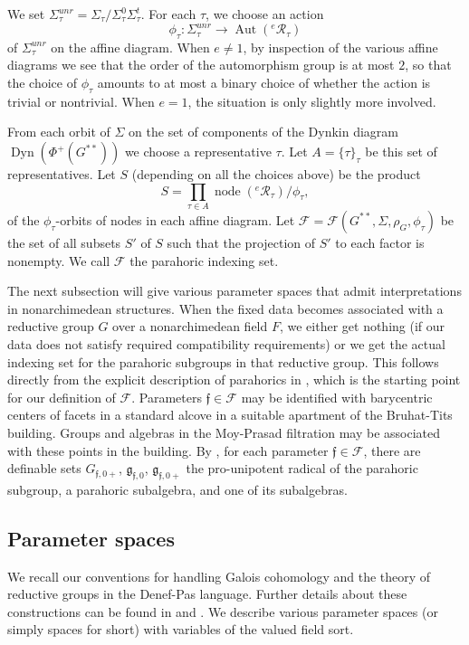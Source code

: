 \documentclass[12pt]{amsart}
\newcommand{\op}[1]{\operatorname{#1}}
\newcommand{\cal}[1]{\mathcal{#1}}
\def\R{\cal{R}}
\def\s{{\mathfrak{f}}}
\newcommand{\cF}{\mathcal{F}}
\newcommand{\fg}{\mathfrak{g}}
\theoremstyle{plain}
\theoremstyle{definition}
\begin{document}
We set $\Sigma^{unr}_\tau = \Sigma_\tau/\Sigma_\tau^0\Sigma^t_\tau$.
For each $\tau$, we choose an action
\[
\phi_\tau:\Sigma^{unr}_\tau\to \op{Aut}({}^e\R_\tau)
\]
of $\Sigma^{unr}_\tau$ on the affine diagram.  When $e\ne 1$, by
inspection of the various affine diagrams we see that the order of the
automorphism group is at most $2$, so that the choice of $\phi_\tau$
amounts to at most a binary choice of whether the action is trivial or
nontrivial.  When $e=1$, the situation is only slightly more
involved.

From each orbit of $\Sigma$ on the set of components of the Dynkin
diagram $\op{Dyn}(\Phi^+(G^{**}))$ we choose a representative
$\tau$.  Let $A = \{\tau\}_\tau$ be this set of representatives.  Let
$S$ (depending on all the choices above) be the product
\[
S = \prod_{\tau\in A} \op{node}({}^e\R_\tau)/\phi_\tau,
\]
of the $\phi_\tau$-orbits of nodes in each affine diagram.  Let $\cF
= \cF(G^{**},\Sigma,\rho_G,\phi_\tau)$ be the set of all
subsets $S'$ of $S$ such that the projection of $S'$ to each factor is
nonempty.  We call $\cF$ the parahoric indexing set.

The next subsection will give various parameter spaces that admit
interpretations in nonarchimedean structures.  When the fixed data
becomes associated with a reductive group $G$ over a nonarchimedean
field $F$, we either get nothing (if our data does not satisfy
required compatibility requirements) or we get the actual indexing set
for the parahoric subgroups in that reductive group.  This follows
directly from the explicit description of parahorics in \cite{Gross},
which is the starting point for our definition of $\cF$.  Parameters
$\s\in \cF$ may be identified with barycentric centers of facets in a
standard alcove in a suitable apartment of the Bruhat-Tits building.
Groups and algebras in the Moy-Prasad filtration may be associated
with these points in the building.  By \cite{CGH}, for each parameter
$\s\in \cF$, there are definable sets $G_{\s,0+}$, $\fg_{\s,0}$,
$\fg_{\s,0+}$ the pro-unipotent radical of the parahoric subgroup, a
parahoric subalgebra, and one of its subalgebras.

\subsection{Parameter spaces}

We recall our conventions for handling Galois cohomology and the
theory of reductive groups in the Denef-Pas language.  Further details
about these constructions can be found in \cite{CHL} and \cite{CGH}.
We describe various parameter spaces (or simply spaces for short) with
variables of the valued field sort.
\end{document}
